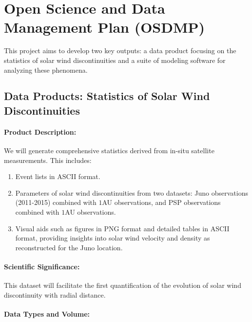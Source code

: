 \documentclass[
  letterpaper,
  DIV=11,
  numbers=noendperiod]{scrartcl}
\let\oldparagraph\paragraph
\renewcommand{\paragraph}[1]{\oldparagraph{#1}\mbox{}}
\providecommand{\tightlist}{%
  \setlength{\itemsep}{0pt}\setlength{\parskip}{0pt}}\usepackage{longtable,booktabs,array}
\begin{document}
\section{Open Science and Data Management Plan
(OSDMP)}\label{open-science-and-data-management-plan-osdmp}

This project aims to develop two key outputs: a data product focusing on
the statistics of solar wind discontinuities and a suite of modeling
software for analyzing these phenomena.

\subsection{Data Products: Statistics of Solar Wind
Discontinuities}\label{data-products-statistics-of-solar-wind-discontinuities}

\paragraph{Product Description:}\label{product-description}

We will generate comprehensive statistics derived from in-situ satellite
measurements. This includes:

\begin{enumerate}
\def\labelenumi{\alph{enumi}.}
\tightlist
\item
  Event lists in ASCII format.
\item
  Parameters of solar wind discontinuities from two datasets: Juno
  observations (2011-2015) combined with \(1\)AU observations, and PSP
  observations combined with \(1\)AU observations.
\item
  Visual aids such as figures in PNG format and detailed tables in ASCII
  format, providing insights into solar wind velocity and density as
  reconstructed for the Juno location.
\end{enumerate}

\paragraph{Scientific Significance:}\label{scientific-significance}

This dataset will facilitate the first quantification of the evolution
of solar wind discontinuity with radial distance.

\paragraph{Data Types and Volume:}\label{data-types-and-volume}
\end{document}

